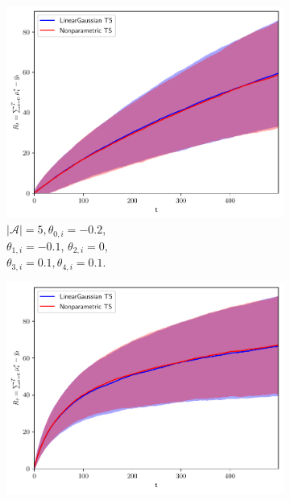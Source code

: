 \begin{figure}[!h]
	\begin{subfigure}[b]{0.32\textwidth}
		\includegraphics[width=\textwidth]{./figs/linearGaussian/cumregret_A5_-02_-02_-01_-01_0_0_01_01_02_02_1_1_1_1_1}
		\vspace*{-5ex}
		\caption{$|\mathcal{A}|=5, \theta_{0,i}=-0.2$,\\ \hspace*{0.3cm} $\theta_{1,i}=-0.1$, $\theta_{2,i}=0$,\\ \hspace*{0.3cm} $\theta_{3,i}=0.1, \theta_{4,i}=0.1$.}
		\label{fig:linear_gaussian_A5_01}
	\end{subfigure}
	\begin{subfigure}[b]{0.32\textwidth}
		\includegraphics[width=\textwidth]{./figs/linearGaussian/cumregret_A5_-1_-1_-05_-05_0_0_05_05_1_1_1_1_1_1_1}

\end{subfigure}
\end{figure}
